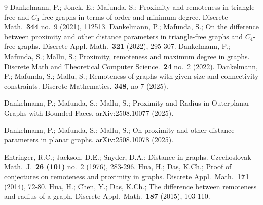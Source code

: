 \documentclass[a4paper,11pt]{article}
\begin{document}
\begin{thebibliography}{9}
  Dankelmann, P.; Jonck, E.; Mafunda, S.; 
     Proximity and remoteness in triangle-free and $C_4$-free graphs in terms of 
     order and minimum degree. 
     Discrete Math.\ {\bf 344} no.\ 9 (2021), 112513. 
  Dankelmann, P.; Mafunda, S.;     
     On the difference between proximity and other distance parameters in triangle-free 
     graphs and $C_4$-free graphs. 
    Discrete Appl. Math.\ {\bf 321} (2022), 295-307.    
  Dankelmann, P.; Mafunda, S.; Mallu, S.;
     Proximity, remoteness and maximum degree in graphs. 
     Discrete Math and Theoretical Computer Science.\ {\bf 24} no.\ 2 (2022).    
       Dankelmann, P.; Mafunda, S.; Mallu, S.;
     Remoteness of graphs with given size and connectivity constraints. Discrete Mathematics.  
{\bf 348}, no 7 (2025). 

     Dankelmann, P.; Mafunda, S.; Mallu, S.; Proximity and Radius in Outerplanar Graphs with Bounded Faces. arXiv:2508.10077 (2025).
      
       Dankelmann, P.; Mafunda, S.; Mallu, S.; On proximity and other distance parameters in planar graphs. arXiv:2508.10078 (2025).
         
 Entringer, R.C.; Jackson, D.E.; Snyder, D.A.;
     Distance in graphs. Czechoslovak Math.\ J.\ {\bf 26 (101)} no.\ 2 (1976), 283-296.   
  Hua, H.;  Das, K.Ch.;
     Proof of conjectures on remoteness and proximity in graphs.
     Discrete Appl.\ Math.\ {\bf 171} (2014), 72-80.     
 Hua, H.; Chen, Y.;  Das, K.Ch.;
     The difference between remoteness and radius of a graph.
     Discrete Appl.\ Math.\ {\bf 187} (2015), 103-110.   
   

\end{thebibliography}
\end{document}
